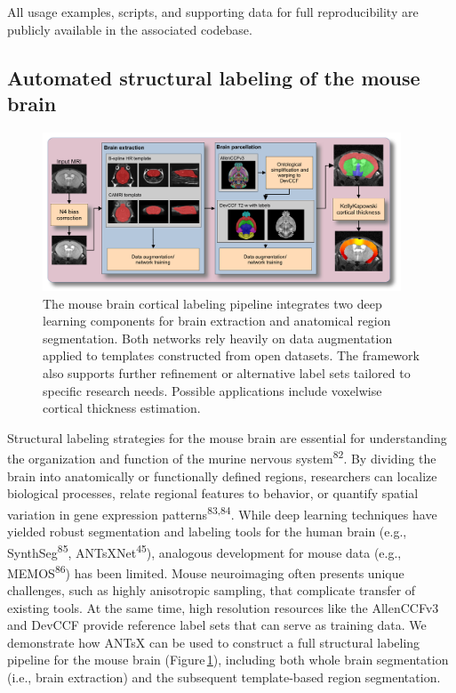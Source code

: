 \documentclass[
  12pt,
]{article}
\begin{document}
All usage examples, scripts, and supporting data for full
reproducibility are publicly available in the associated codebase.

\subsection{Automated structural labeling of the mouse
brain}\label{automated-structural-labeling-of-the-mouse-brain}

\begin{figure}
\centering
\includegraphics[width=0.95\textwidth]{Figures/mousePipeline.pdf} \caption{The
mouse brain cortical labeling pipeline integrates two deep learning components
for brain extraction and anatomical region segmentation. Both networks rely
heavily on data augmentation applied to templates constructed from open
datasets. The framework also supports further refinement or alternative label
sets tailored to specific research needs. Possible applications include
voxelwise cortical thickness estimation.}
\label{fig:mouseKK}
\end{figure}

Structural labeling strategies for the mouse brain are essential for
understanding the organization and function of the murine nervous
system\textsuperscript{82}. By dividing the brain into anatomically or
functionally defined regions, researchers can localize biological
processes, relate regional features to behavior, or quantify spatial
variation in gene expression patterns\textsuperscript{83,84}. While deep
learning techniques have yielded robust segmentation and labeling tools
for the human brain (e.g., SynthSeg\textsuperscript{85},
ANTsXNet\textsuperscript{45}), analogous development for mouse data
(e.g., MEMOS\textsuperscript{86}) has been limited. Mouse neuroimaging
often presents unique challenges, such as highly anisotropic sampling,
that complicate transfer of existing tools. At the same time, high
resolution resources like the AllenCCFv3 and DevCCF provide reference
label sets that can serve as training data. We demonstrate how ANTsX can
be used to construct a full structural labeling pipeline for the mouse
brain (Figure\,\ref{fig:mouseKK}), including both whole brain
segmentation (i.e., brain extraction) and the subsequent template-based
region segmentation.
\end{document}
